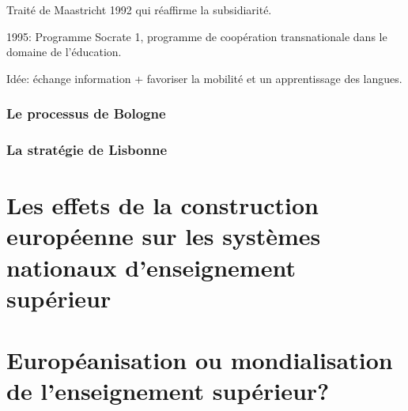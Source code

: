 Traité de Maastricht 1992 qui réaffirme la subsidiarité.

1995: Programme Socrate 1, programme de coopération transnationale dans le domaine de l'éducation.

Idée: échange information + favoriser la mobilité et un apprentissage des langues.

	\subsubsection{Le processus de Bologne}
	
	\subsubsection{La stratégie de Lisbonne}






\section{Les effets de la construction européenne sur les systèmes nationaux d'enseignement supérieur}

\section{Européanisation ou mondialisation de l'enseignement supérieur?}

